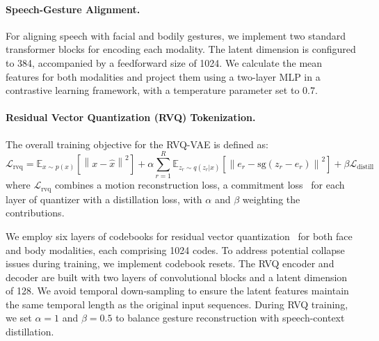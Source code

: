 \paragraph{Speech-Gesture Alignment.}
For aligning speech with facial and bodily gestures, we implement two standard transformer blocks for encoding each modality. The latent dimension is configured to 384, accompanied by a feedforward size of 1024. We calculate the mean features for both modalities and project them using a two-layer MLP in a contrastive learning framework, with a temperature parameter set to 0.7.

\paragraph{Residual Vector Quantization (RVQ) Tokenization.}

The overall training objective for the RVQ-VAE is defined as:
\begin{equation}
\mathcal{L}_{\text{rvq}} = \mathbb{E}_{x \sim p(x)} \left[ \left\| x - \hat{x} \right\|^2 \right] + \alpha \sum_{r=1}^{R} \mathbb{E}_{z_r \sim q(z_r|x)} \left[ \left\| e_r - \text{sg} \left( z_r - e_r \right) \right\|^2 \right] + \beta \mathcal{L}_{\text{distill}}
\end{equation}
where \( \mathcal{L}_{\text{rvq}} \) combines a motion reconstruction loss, a commitment loss~\cite{oord2018neuraldiscreterepresentationlearning} for each layer of quantizer with a distillation loss, with \( \alpha \) and \( \beta \) weighting the contributions.

We employ six layers of codebooks for residual vector quantization~\cite{rvq} for both face and body modalities, each comprising 1024 codes. To address potential collapse issues during training, we implement codebook resets. The RVQ encoder and decoder are built with two layers of convolutional blocks and a latent dimension of 128. We avoid temporal down-sampling to ensure the latent features maintain the same temporal length as the original input sequences. During RVQ training, we set \(\alpha = 1\) and \(\beta = 0.5\) to balance gesture reconstruction with speech-context distillation.


